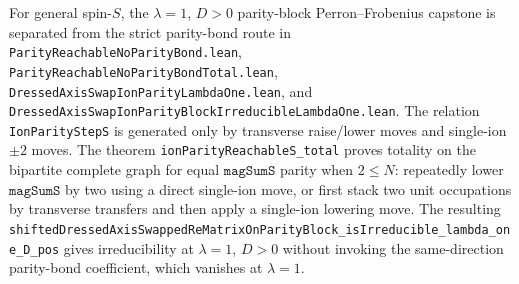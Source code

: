 \documentclass[a4paper,11pt]{article}
\begin{document}
For general spin-\(S\), the \(\lambda=1\), \(D>0\) parity-block
Perron--Frobenius capstone is separated from the strict parity-bond route in
\texttt{ParityReachableNoParityBond.lean},
\texttt{ParityReachableNoParityBondTotal.lean},
\texttt{DressedAxisSwapIonParityLambdaOne.lean}, and
\texttt{DressedAxisSwapIonParityBlockIrreducibleLambdaOne.lean}.  The relation
\texttt{IonParityStepS} is generated only by transverse raise/lower moves and
single-ion \(\pm2\) moves.  The theorem \texttt{ionParityReachableS\_total}
proves totality on the bipartite complete graph for equal \(\texttt{magSumS}\)
parity when \(2\le N\): repeatedly lower \(\texttt{magSumS}\) by two using a
direct single-ion move, or first stack two unit occupations by transverse
transfers and then apply a single-ion lowering move.  The resulting
\texttt{shiftedDressedAxisSwappedReMatrixOnParityBlock\_isIrreducible\_lambda\_one\_D\_pos}
gives irreducibility at \(\lambda=1\), \(D>0\) without invoking the
same-direction parity-bond coefficient, which vanishes at \(\lambda=1\).
\end{document}

